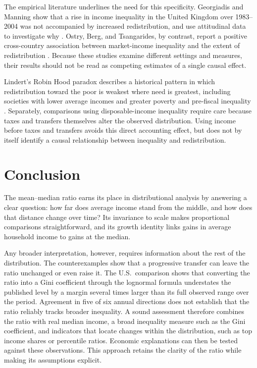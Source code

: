 \documentclass[11pt,a4paper]{article}
\begin{document}
The empirical literature underlines the need for this specificity. Georgiadis and Manning show that a rise in income inequality in the United Kingdom over 1983--2004 was not accompanied by increased redistribution, and use attitudinal data to investigate why \cite{georgiadis}. Ostry, Berg, and Tsangarides, by contrast, report a positive cross-country association between market-income inequality and the extent of redistribution \cite{ostry}. Because these studies examine different settings and measures, their results should not be read as competing estimates of a single causal effect.

Lindert's Robin Hood paradox describes a historical pattern in which redistribution toward the poor is weakest where need is greatest, including societies with lower average incomes and greater poverty and pre-fiscal inequality \cite[p.~15]{lindert}. Separately, comparisons using disposable-income inequality require care because taxes and transfers themselves alter the observed distribution. Using income before taxes and transfers avoids this direct accounting effect, but does not by itself identify a causal relationship between inequality and redistribution.


\section{Conclusion}

The mean--median ratio earns its place in distributional analysis by answering a clear question: how far does average income stand from the middle, and how does that distance change over time? Its invariance to scale makes proportional comparisons straightforward, and its growth identity links gains in average household income to gains at the median.

Any broader interpretation, however, requires information about the rest of the distribution. The counterexamples show that a progressive transfer can leave the ratio unchanged or even raise it. The U.S.\ comparison shows that converting the ratio into a Gini coefficient through the lognormal formula understates the published level by a margin several times larger than its full observed range over the period. Agreement in five of six annual directions does not establish that the ratio reliably tracks broader inequality. A sound assessment therefore combines the ratio with real median income, a broad inequality measure such as the Gini coefficient, and indicators that locate changes within the distribution, such as top income shares or percentile ratios. Economic explanations can then be tested against these observations. This approach retains the clarity of the ratio while making its assumptions explicit.
\end{document}
